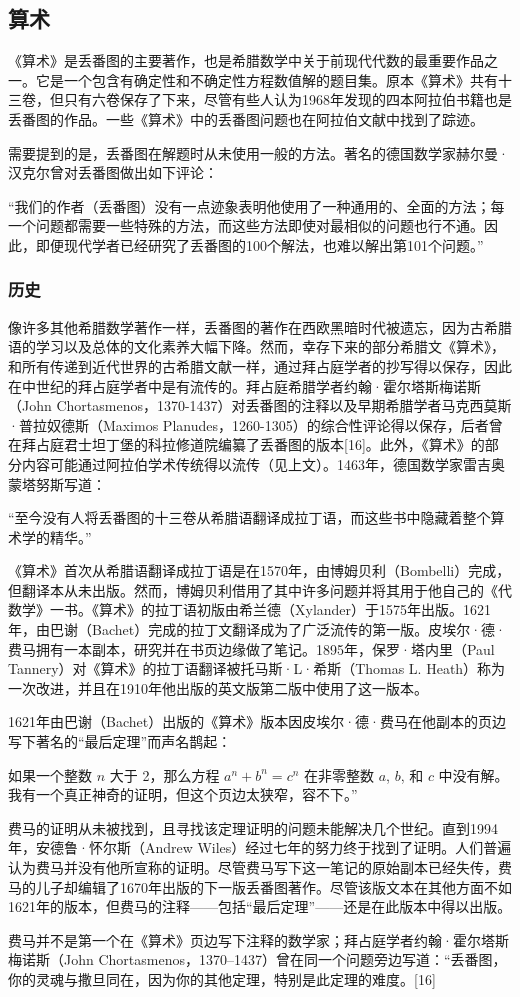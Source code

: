 \subsection{算术}
《算术》是丢番图的主要著作，也是希腊数学中关于前现代代数的最重要作品之一。它是一个包含有确定性和不确定性方程数值解的题目集。原本《算术》共有十三卷，但只有六卷保存了下来，尽管有些人认为1968年发现的四本阿拉伯书籍也是丢番图的作品。一些《算术》中的丢番图问题也在阿拉伯文献中找到了踪迹。

需要提到的是，丢番图在解题时从未使用一般的方法。著名的德国数学家赫尔曼·汉克尔曾对丢番图做出如下评论：

“我们的作者（丢番图）没有一点迹象表明他使用了一种通用的、全面的方法；每一个问题都需要一些特殊的方法，而这些方法即使对最相似的问题也行不通。因此，即便现代学者已经研究了丢番图的100个解法，也难以解出第101个问题。”
\subsubsection{历史}
像许多其他希腊数学著作一样，丢番图的著作在西欧黑暗时代被遗忘，因为古希腊语的学习以及总体的文化素养大幅下降。然而，幸存下来的部分希腊文《算术》，和所有传递到近代世界的古希腊文献一样，通过拜占庭学者的抄写得以保存，因此在中世纪的拜占庭学者中是有流传的。拜占庭希腊学者约翰·霍尔塔斯梅诺斯（John Chortasmenos，1370-1437）对丢番图的注释以及早期希腊学者马克西莫斯·普拉奴德斯（Maximos Planudes，1260-1305）的综合性评论得以保存，后者曾在拜占庭君士坦丁堡的科拉修道院编纂了丢番图的版本[16]。此外，《算术》的部分内容可能通过阿拉伯学术传统得以流传（见上文）。1463年，德国数学家雷吉奥蒙塔努斯写道：

“至今没有人将丢番图的十三卷从希腊语翻译成拉丁语，而这些书中隐藏着整个算术学的精华。”

《算术》首次从希腊语翻译成拉丁语是在1570年，由博姆贝利（Bombelli）完成，但翻译本从未出版。然而，博姆贝利借用了其中许多问题并将其用于他自己的《代数学》一书。《算术》的拉丁语初版由希兰德（Xylander）于1575年出版。1621年，由巴谢（Bachet）完成的拉丁文翻译成为了广泛流传的第一版。皮埃尔·德·费马拥有一本副本，研究并在书页边缘做了笔记。1895年，保罗·塔内里（Paul Tannery）对《算术》的拉丁语翻译被托马斯·L·希斯（Thomas L. Heath）称为一次改进，并且在1910年他出版的英文版第二版中使用了这一版本。


1621年由巴谢（Bachet）出版的《算术》版本因皮埃尔·德·费马在他副本的页边写下著名的“最后定理”而声名鹊起：

如果一个整数 \( n \) 大于 2，那么方程 \( a^n + b^n = c^n \) 在非零整数 \( a \), \( b \), 和 \( c \) 中没有解。我有一个真正神奇的证明，但这个页边太狭窄，容不下。”

费马的证明从未被找到，且寻找该定理证明的问题未能解决几个世纪。直到1994年，安德鲁·怀尔斯（Andrew Wiles）经过七年的努力终于找到了证明。人们普遍认为费马并没有他所宣称的证明。尽管费马写下这一笔记的原始副本已经失传，费马的儿子却编辑了1670年出版的下一版丢番图著作。尽管该版文本在其他方面不如1621年的版本，但费马的注释——包括“最后定理”——还是在此版本中得以出版。

费马并不是第一个在《算术》页边写下注释的数学家；拜占庭学者约翰·霍尔塔斯梅诺斯（John Chortasmenos，1370–1437）曾在同一个问题旁边写道：“丢番图，你的灵魂与撒旦同在，因为你的其他定理，特别是此定理的难度。[16]